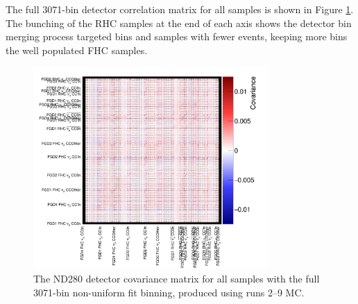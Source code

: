 The full 3071-bin detector correlation matrix for all samples is shown in Figure \ref{fig:detcorrFitAll}. The bunching of the RHC samples at the end of each axis shows the detector bin merging process targeted bins and samples with fewer events, keeping more bins the well populated FHC samples.

\begin{figure}[!htbp]
\centering
\includegraphics*[width=0.8\textwidth,clip]{figs/detcovFit}
\caption{The ND280 detector covariance matrix for all samples with the full 3071-bin non-uniform fit binning, produced using runs 2--9 MC.}\label{fig:detcorrFitAll}
\end{figure}